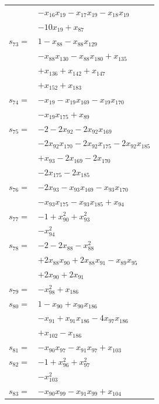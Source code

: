 \begin{longtable}{@{}r@{\;}l@{}}
 & \(\displaystyle -x_{16}x_{19} -x_{17}x_{19} -x_{18}x_{19}\) \\
 & \(\displaystyle -10x_{19} +x_{87}\) \\[3pt]
\(s_{73}=\) & \(\displaystyle 1 -x_{88} -x_{88}x_{129}\) \\
 & \(\displaystyle -x_{88}x_{130} -x_{88}x_{180} +x_{135}\) \\
 & \(\displaystyle +x_{136} +x_{142} +x_{147}\) \\
 & \(\displaystyle +x_{152} +x_{183}\) \\[3pt]
\(s_{74}=\) & \(\displaystyle -x_{19} -x_{19}x_{169} -x_{19}x_{170}\) \\
 & \(\displaystyle -x_{19}x_{175} +x_{89}\) \\[3pt]
\(s_{75}=\) & \(\displaystyle -2 -2x_{92} -2x_{92}x_{169}\) \\
 & \(\displaystyle -2x_{92}x_{170} -2x_{92}x_{175} -2x_{92}x_{185}\) \\
 & \(\displaystyle +x_{93} -2x_{169} -2x_{170}\) \\
 & \(\displaystyle -2x_{175} -2x_{185}\) \\[3pt]
\(s_{76}=\) & \(\displaystyle -2x_{93} -x_{93}x_{169} -x_{93}x_{170}\) \\
 & \(\displaystyle -x_{93}x_{175} -x_{93}x_{185} +x_{94}\) \\[3pt]
\(s_{77}=\) & \(\displaystyle -1 +x_{90}^{2} +x_{93}^{2}\) \\
 & \(\displaystyle -x_{94}^{2}\) \\[3pt]
\(s_{78}=\) & \(\displaystyle -2 -2x_{88} -x_{88}^{2}\) \\
 & \(\displaystyle +2x_{88}x_{90} +2x_{88}x_{91} -x_{89}x_{95}\) \\
 & \(\displaystyle +2x_{90} +2x_{91}\) \\[3pt]
\(s_{79}=\) & \(\displaystyle -x_{98}^{2} +x_{186}\) \\[3pt]
\(s_{80}=\) & \(\displaystyle 1 -x_{90} +x_{90}x_{186}\) \\
 & \(\displaystyle -x_{91} +x_{91}x_{186} -4x_{97}x_{186}\) \\
 & \(\displaystyle +x_{102} -x_{186}\) \\[3pt]
\(s_{81}=\) & \(\displaystyle -x_{90}x_{97} -x_{91}x_{97} +x_{103}\) \\[3pt]
\(s_{82}=\) & \(\displaystyle -1 +x_{96}^{2} +x_{97}^{2}\) \\
 & \(\displaystyle -x_{103}^{2}\) \\[3pt]
\(s_{83}=\) & \(\displaystyle -x_{90}x_{99} -x_{91}x_{99} +x_{104}\) \\[3pt]

\end{longtable}
